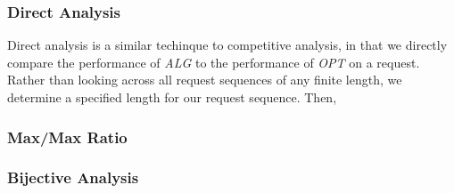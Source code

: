 \subsubsection*{Direct Analysis}
\label{sec:Direct}
Direct analysis is a similar techinque to competitive analysis, in that we directly compare the performance of \textit{ALG} to the performance of \textit{OPT} on a request. Rather than looking across all request sequences of any finite length, we determine a specified length for our request sequence. Then, 

\subsubsection*{Max/Max Ratio}
\label{sec:MaxMax}

\subsubsection*{Bijective Analysis}
\label{sec:Bij}